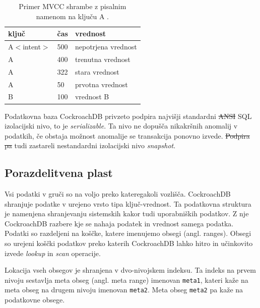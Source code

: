 \documentclass[a4paper, 12pt]{book}
\providecommand{\DIFaddtex}[1]{{\protect\color{blue}\uwave{#1}}} %
\providecommand{\DIFdeltex}[1]{{\protect\color{red}\sout{#1}}}                      %
\providecommand{\DIFaddbegin}{} %
\providecommand{\DIFaddend}{} %
\providecommand{\DIFdelbegin}{} %
\providecommand{\DIFdelend}{} %
\providecommand{\DIFaddbeginFL}{} %
\providecommand{\DIFaddendFL}{} %
\providecommand{\DIFdelbeginFL}{} %
\providecommand{\DIFdelendFL}{} %
\providecommand{\DIFadd}[1]{\texorpdfstring{\DIFaddtex{#1}}{#1}} %
\providecommand{\DIFdel}[1]{\texorpdfstring{\DIFdeltex{#1}}{}} %
\newcommand{\DIFscaledelfig}{0.5}
\newlength{\DIFdelgraphicswidth} %
\newlength{\DIFdelgraphicsheight} %
\newcommand{\DIFaddincludegraphics}[2][]{{\color{blue}\fbox{\DIFOincludegraphics[#1]{#2}}}} %
\newcommand{\DIFdelincludegraphics}[2][]{%
\sbox{\DIFdelgraphicsbox}{\DIFOincludegraphics[#1]{#2}}%
\settoboxwidth{\DIFdelgraphicswidth}{\DIFdelgraphicsbox} %
\settoboxtotalheight{\DIFdelgraphicsheight}{\DIFdelgraphicsbox} %
\scalebox{\DIFscaledelfig}{%
\parbox[b]{\DIFdelgraphicswidth}{\usebox{\DIFdelgraphicsbox}\\[-\baselineskip] \rule{\DIFdelgraphicswidth}{0em}}\llap{\resizebox{\DIFdelgraphicswidth}{\DIFdelgraphicsheight}{%
\setlength{\unitlength}{\DIFdelgraphicswidth}%
\begin{picture}(1,1)%
\thicklines\linethickness{2pt} %
{\color[rgb]{1,0,0}\put(0,0){\framebox(1,1){}}}%
{\color[rgb]{1,0,0}\put(0,0){\line( 1,1){1}}}%
{\color[rgb]{1,0,0}\put(0,1){\line(1,-1){1}}}%
\end{picture}%
}\hspace*{3pt}}} %
} %
\DeclareRobustCommand{\DIFaddbegin}{\DIFOaddbegin \let\includegraphics\DIFaddincludegraphics} %
\DeclareRobustCommand{\DIFaddend}{\DIFOaddend \let\includegraphics\DIFOincludegraphics} %
\DeclareRobustCommand{\DIFdelbegin}{\DIFOdelbegin \let\includegraphics\DIFdelincludegraphics} %
\DeclareRobustCommand{\DIFdelend}{\DIFOaddend \let\includegraphics\DIFOincludegraphics} %
\DeclareRobustCommand{\DIFaddbeginFL}{\DIFOaddbeginFL \let\includegraphics\DIFaddincludegraphics} %
\DeclareRobustCommand{\DIFaddendFL}{\DIFOaddendFL \let\includegraphics\DIFOincludegraphics} %
\DeclareRobustCommand{\DIFdelbeginFL}{\DIFOdelbeginFL \let\includegraphics\DIFdelincludegraphics} %
\DeclareRobustCommand{\DIFdelendFL}{\DIFOaddendFL \let\includegraphics\DIFOincludegraphics} %
\begin{document}
\begin{table}[H]
\begin{center}
\DIFdelbeginFL %
\DIFdelendFL \DIFaddbeginFL \begin{tabular}{ l|l|l } 
\DIFaddendFL \textbf{ključ} & \textbf{čas} & \textbf{vrednost} \\
\hline
A$<$intent$>$ & 500 & nepotrjena vrednost \\
A & 400 & trenutna vrednost \\ 
A & 322 & stara vrednost \\ 
A & 50 & prvotna vrednost \\
B & 100 & vrednost B \\
\DIFdelbeginFL %
\DIFdelendFL \end{tabular}
\end{center}
\caption{Primer MVCC shrambe z pisalnim namenom na ključu A \cite{CRDB-blog-transaction-isolation}.}
\label{tbl_crdb_mvcc_store}
\end{table}

Podatkovna baza CockroachDB privzeto podpira najvišji standardni \DIFdelbegin \DIFdel{AN\-SI }\DIFdelend SQL izolacijski nivo, to je \textit{serializable}. Ta nivo ne dopušča nikakršnih anomalij v podatkih, če obstaja možnost anomalije se transakcija ponovno izvede. \DIFdelbegin \DIFdel{Podpira pa }\DIFdelend \DIFaddbegin \DIFadd{Alternativno podpira }\DIFaddend tudi zastareli nestandardni izolacijski nivo \textit{snapshot}.

 
\subsection{Porazdelitvena plast}

Vsi podatki v gruči so na voljo preko kateregakoli vozlišča. CockroachDB shranjuje podatke v urejeno vrsto tipa ključ-vrednost. Ta podatkovna stru\-ktu\-ra je namenjena shranjevanju sistemskih kakor tudi uporabniških podatkov. Z nje CockroachDB razbere kje se nahaja podatek in vrednost samega podatka. Podatki so razdeljeni na koščke, katere imenujemo obsegi (angl. ranges). Obsegi so urejeni koščki podatkov preko katerih CockroachDB lahko hitro in učinkovito izvede \textit{lookup} in \textit{scan} operacije.

Lokacija vseh obsegov je shranjena v dvo-nivojskem indeksu. Ta indeks na prvem nivoju sestavlja meta obseg (angl. meta range) imenovan \texttt{meta1}, kateri kaže na meta obseg na drugem nivoju imenovan \texttt{meta2}. Meta obseg \texttt{meta2} pa kaže na podatkovne obsege.
\end{document}
